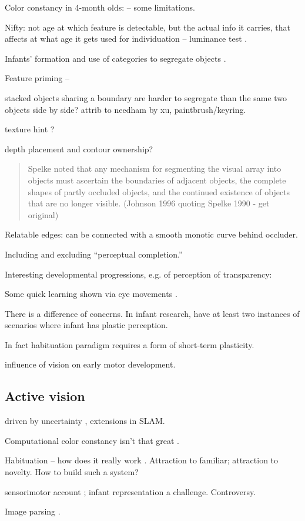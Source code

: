 Color constancy in 4-month olds: \cite{dannemiller87test} -- some 
limitations.

Nifty: not age at which feature is detectable, but the actual
info it carries, that affects at what age it gets used for
individuation -- luminance test \cite{woods05infants}.

Infants' formation and use of categories to segregate objects 
\cite{needham05infants}.

Feature priming -- \cite{wilcox04priming}


stacked objects sharing a boundary are harder
to segregate than the same two objects
side by side?  attrib to needham by xu,
paintbrush/keyring.


texture hint \cite{johnson96perception}?

depth placement and contour ownership?

\begin{quote}

Spelke noted that any mechanism for segmenting the visual array
into objects must ascertain the boundaries of adjacent objects,
the complete shapes of partly occluded objects, and the continued
existence of objects that are no longer visible.
(Johnson 1996 quoting Spelke 1990 - get original)

\end{quote}

Relatable edges: can be connected with a smooth monotic
curve behind occluder.

Including and excluding ``perceptual completion.''

Interesting developmental progressions, e.g. of perception
of transparency: \cite{johnson00infants}


Some quick learning shown via eye movements \cite{johnson03development}.


There is a difference of concerns.  In infant research, have
at least two instances of scenarios where infant has
plastic perception.

In fact habituation paradigm requires a form of short-term
plasticity. 


\cite{prechtl01role} influence of vision on early motor 
development.

\subsection{Active vision}

\cite{bajcsy88active,aloimonos87active,ballard91animate}

driven by uncertainty \cite{whaite97autonomous}, 
extensions in SLAM.

Computational color constancy isn't that great
\cite{barnard02comparison}.

Habituation -- how does it really work \cite{sirois02models}.
Attraction to familiar; attraction to novelty.
How to build such a system?

sensorimotor account \cite{oregan01sensorimotor};
infant representation a challenge.  Controversy.

Image parsing \cite{tu05image}.

